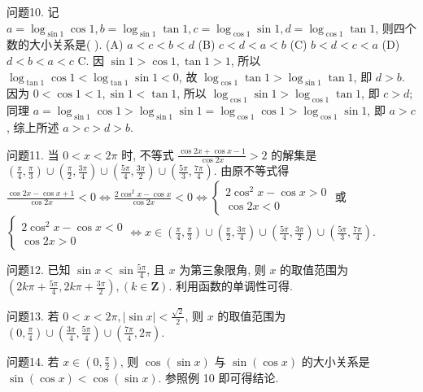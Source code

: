 问题10. 记 $a=\log _{\sin 1} \cos 1, b=\log _{\sin 1} \tan 1, c=\log _{\cos 1} \sin 1, d=\log _{\cos 1} \tan 1$, 则四个数的大小关系是( ).
(A) $a<c<b<d$
(B) $c<d<a<b$
(C) $b<d<c<a$
(D) $d<b<a<c$
C. 因 $\sin 1>\cos 1, \tan 1>1$, 所以 $\log _{\tan 1} \cos 1<\log _{\tan 1} \sin 1<0$, 故 $\log _{\cos 1} \tan 1>\log _{\sin 1} \tan 1$, 即 $d>b$. 因为 $0<\cos 1<1, \sin 1<\tan 1$, 所以 $\log _{\cos 1} \sin 1>\log _{\cos 1} \tan 1$, 即 $c>d$; 同理 $a=\log _{\sin 1} \cos 1>\log _{\sin 1} \sin 1= \log _{\cos 1} \cos 1>\log _{\cos 1} \sin 1$, 即 $a>c$, 综上所述 $a>c>d>b$.



问题11. 当 $0<x<2 \pi$ 时, 不等式 $\frac{\cos 2 x+\cos x-1}{\cos 2 x}>2$ 的解集是
$\left(\frac{\pi}{4}, \frac{\pi}{3}\right) \cup\left(\frac{\pi}{2}, \frac{3 \pi}{4}\right) \cup\left(\frac{5 \pi}{4}, \frac{3 \pi}{2}\right) \cup\left(\frac{5 \pi}{3}, \frac{7 \pi}{4}\right)$. 由原不等式得 $\frac{\cos 2 x-\cos x+1}{\cos 2 x}<0 \Leftrightarrow \frac{2 \cos ^2 x-\cos x}{\cos 2 x}<0 \Leftrightarrow\left\{\begin{array}{l}2 \cos ^2 x-\cos x>0 \\ \cos 2 x<0\end{array}\right.$ 或 $\left\{\begin{array}{l}2 \cos ^2 x-\cos x<0 \\ \cos 2 x>0\end{array} \Leftrightarrow x \in\left(\frac{\pi}{4}, \frac{\pi}{3}\right) \cup\left(\frac{\pi}{2}, \frac{3 \pi}{4}\right) \cup\left(\frac{5 \pi}{4}, \frac{3 \pi}{2}\right) \cup\left(\frac{5 \pi}{3}, \frac{7 \pi}{4}\right)\right.$.



问题12. 已知 $\sin x<\sin \frac{5 \pi}{4}$, 且 $x$ 为第三象限角, 则 $x$ 的取值范围为
$\left(2 k \pi+\frac{5 \pi}{4}, 2 k \pi+\frac{3 \pi}{2}\right),(k \in \mathbf{Z})$. 利用函数的单调性可得.



问题13. 若 $0<x<2 \pi,|\sin x|<\frac{\sqrt{2}}{2}$, 则 $x$ 的取值范围为
$\left(0, \frac{\pi}{4}\right) \cup\left(\frac{3 \pi}{4}, \frac{5 \pi}{4}\right) \cup\left(\frac{7 \pi}{4}, 2 \pi\right)$.



问题14. 若 $x \in\left(0, \frac{\pi}{2}\right)$, 则 $\cos (\sin x)$ 与 $\sin (\cos x)$ 的大小关系是
$\sin (\cos x)<\cos (\sin x)$. 参照例 10 即可得结论.



